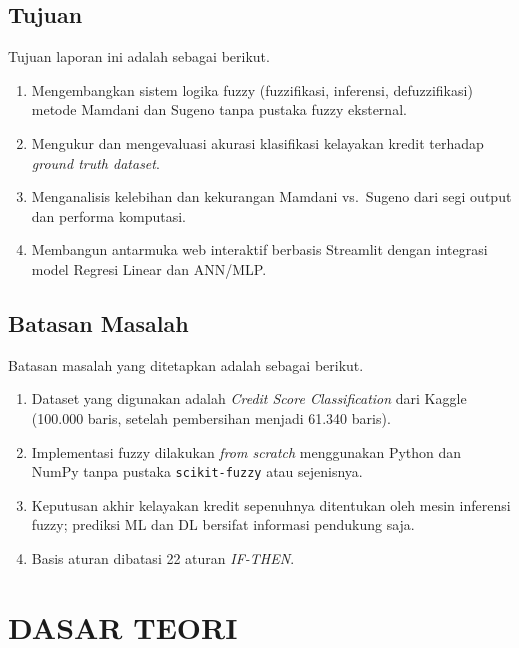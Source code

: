 \documentclass[12pt,a4paper]{report}
\begin{document}
\section{Tujuan}

Tujuan laporan ini adalah sebagai berikut.
\begin{enumerate}[label=\arabic*.]
  \item Mengembangkan sistem logika fuzzy (fuzzifikasi, inferensi,
        defuzzifikasi) metode Mamdani dan Sugeno tanpa pustaka
        fuzzy eksternal.
  \item Mengukur dan mengevaluasi akurasi klasifikasi kelayakan
        kredit terhadap \textit{ground truth dataset}.
  \item Menganalisis kelebihan dan kekurangan Mamdani vs.\ Sugeno
        dari segi output dan performa komputasi.
  \item Membangun antarmuka web interaktif berbasis Streamlit
        dengan integrasi model Regresi Linear dan ANN/MLP.
\end{enumerate}

\section{Batasan Masalah}

Batasan masalah yang ditetapkan adalah sebagai berikut.
\begin{enumerate}[label=\arabic*.]
  \item Dataset yang digunakan adalah \textit{Credit Score
        Classification} dari Kaggle (100.000 baris, setelah
        pembersihan menjadi 61.340 baris).
  \item Implementasi fuzzy dilakukan \textit{from scratch}
        menggunakan Python dan NumPy tanpa pustaka
        \texttt{scikit-fuzzy} atau sejenisnya.
  \item Keputusan akhir kelayakan kredit sepenuhnya ditentukan
        oleh mesin inferensi fuzzy; prediksi ML dan DL bersifat
        informasi pendukung saja.
  \item Basis aturan dibatasi 22 aturan \textit{IF-THEN}.
\end{enumerate}

\chapter{DASAR TEORI}
\end{document}
